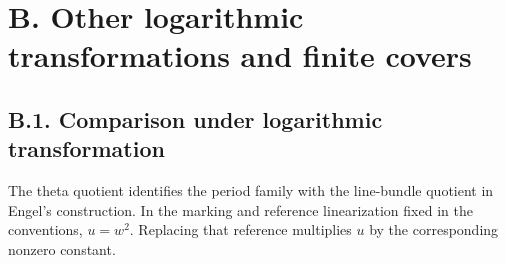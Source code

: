 \section{B. Other logarithmic transformations and finite covers}

\subsection{B.1. Comparison under logarithmic transformation}

\begin{proposition}\label{inv:B1.0}
The theta quotient identifies the period family with the line-bundle
quotient in Engel's construction. In the marking and reference
linearization fixed in the conventions, $u=w^2$. Replacing that
reference multiplies $u$ by the corresponding nonzero constant.
\end{proposition}
